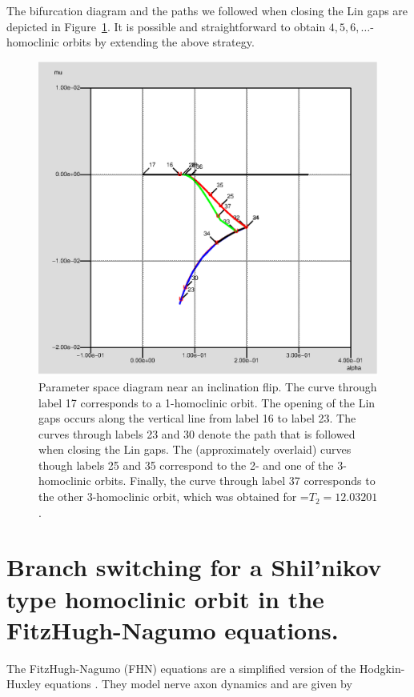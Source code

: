 \documentclass[12pt]{report}
\begin{document}
The bifurcation diagram and the paths we followed when closing the Lin
gaps are depicted in Figure~\ref{parspace}. It is possible and
straightforward to obtain $4, 5, 6, \dots$-homoclinic orbits by 
extending the above strategy.
\begin{figure}[htb]
\begin{center}
\includegraphics[scale=0.5]{include/parspace.eps}
\caption{Parameter space diagram near an inclination flip. 
The curve
through label 17 corresponds to a 1-homoclinic orbit. 
The opening of the Lin gaps occurs along the vertical line from
label 16 to label 23. The curves
through labels 23 and 30 denote the path that is followed when
closing the Lin gaps. The (approximately overlaid)
curves though labels 25 and 35 correspond to the 
2- and one of the 3-homoclinic orbits.
Finally, the curve through label 37 corresponds to the other
3-homoclinic orbit, which was obtained for =$T_2=12.03201$.}
\label{parspace}
\end{center}
\end{figure}

\section{ Branch switching for a Shil'nikov type homoclinic orbit in
the FitzHugh-Nagumo equations.}

The FitzHugh-Nagumo (FHN) equations \cite{FitzH:61,NaArYo:62} 
are a simplified version of the
Hodgkin-Huxley equations \cite{HoHu:52}. 
They model nerve axon dynamics and are given by
\end{document}
